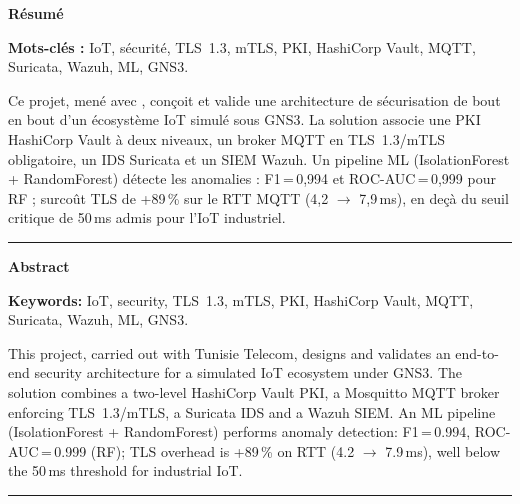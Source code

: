 \cleardoublepage
\thispagestyle{empty}
\pagestyle{empty}

\begingroup
\setlength{\parskip}{0pt}
\setlength{\parindent}{0pt}
\renewcommand{\baselinestretch}{1.1}
\footnotesize

\begin{center}
  \textbf{\normalsize Résumé}
\end{center}
\noindent\textbf{Mots-clés :} IoT, sécurité, TLS~1.3, mTLS, PKI, HashiCorp Vault, MQTT, Suricata, Wazuh, ML, GNS3.

\smallskip
\noindent Ce projet, mené avec \TT{}, conçoit et valide une architecture de sécurisation de bout en bout d'un
écosystème IoT simulé sous GNS3. La solution associe une PKI HashiCorp Vault à deux niveaux, un broker MQTT
en TLS~1.3/mTLS obligatoire, un IDS Suricata et un SIEM Wazuh. Un pipeline ML (IsolationForest + RandomForest)
détecte les anomalies : F1\,=\,0,994 et ROC-AUC\,=\,0,999 pour RF ; surcoût TLS de +89\,\% sur le RTT MQTT
(4,2 $\to$ 7,9\,ms), en deçà du seuil critique de 50\,ms admis pour l'IoT industriel.

\vspace{4pt}\noindent\rule{\linewidth}{0.4pt}\vspace{4pt}

\begin{center}
  \textbf{\normalsize Abstract}
\end{center}
\noindent\textbf{Keywords:} IoT, security, TLS~1.3, mTLS, PKI, HashiCorp Vault, MQTT, Suricata, Wazuh, ML, GNS3.

\smallskip
\noindent This project, carried out with Tunisie Telecom, designs and validates an end-to-end security architecture for a
simulated IoT ecosystem under GNS3. The solution combines a two-level HashiCorp Vault PKI, a Mosquitto MQTT
broker enforcing TLS~1.3/mTLS, a Suricata IDS and a Wazuh SIEM. An ML pipeline (IsolationForest + RandomForest)
performs anomaly detection: F1\,=\,0.994, ROC-AUC\,=\,0.999 (RF); TLS overhead is +89\,\% on RTT
(4.2 $\to$ 7.9\,ms), well below the 50\,ms threshold for industrial IoT.

\vspace{4pt}\noindent\rule{\linewidth}{0.4pt}\vspace{4pt}

